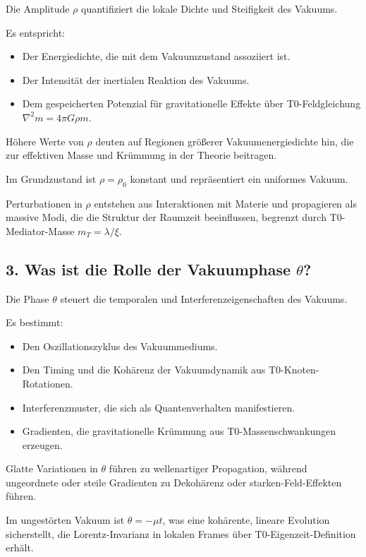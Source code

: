 \documentclass[12pt,a4paper]{article}
\begin{document}
	Die Amplitude $\rho$ quantifiziert die lokale Dichte und Steifigkeit des Vakuums.
	
	Es entspricht:
	\begin{itemize}
		\item Der Energiedichte, die mit dem Vakuumzustand assoziiert ist.
		\item Der Intensität der inertialen Reaktion des Vakuums.
		\item Dem gespeicherten Potenzial für gravitationelle Effekte über T0-Feldgleichung $\nabla^2 m = 4\pi G \rho m$.
	\end{itemize}
	
	Höhere Werte von $\rho$ deuten auf Regionen größerer Vakuumenergiedichte hin, die zur effektiven Masse und Krümmung in der Theorie beitragen.
	
	Im Grundzustand ist $\rho = \rho_0$ konstant und repräsentiert ein uniformes Vakuum.
	
	Perturbationen in $\rho$ entstehen aus Interaktionen mit Materie und propagieren als massive Modi, die die Struktur der Raumzeit beeinflussen, begrenzt durch T0-Mediator-Masse $m_T = \lambda / \xi$.
	
	\subsection{3. Was ist die Rolle der Vakuumphase $\theta$?}
	
	Die Phase $\theta$ steuert die temporalen und Interferenzeigenschaften des Vakuums.
	
	Es bestimmt:
	\begin{itemize}
		\item Den Oszillationszyklus des Vakuummediums.
		\item Den Timing und die Kohärenz der Vakuumdynamik aus T0-Knoten-Rotationen.
		\item Interferenzmuster, die sich als Quantenverhalten manifestieren.
		\item Gradienten, die gravitationelle Krümmung aus T0-Massenschwankungen erzeugen.
	\end{itemize}
	
	Glatte Variationen in $\theta$ führen zu wellenartiger Propagation, während ungeordnete oder steile Gradienten zu Dekohärenz oder starken-Feld-Effekten führen.
	
	Im ungestörten Vakuum ist $\theta = -\mu t$, was eine kohärente, lineare Evolution sicherstellt, die Lorentz-Invarianz in lokalen Frames über T0-Eigenzeit-Definition erhält.
	
\end{document}
